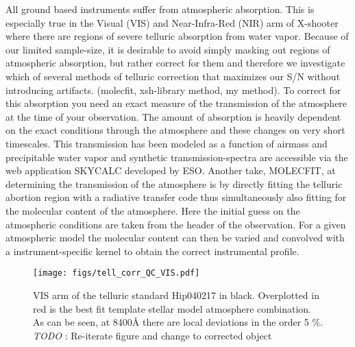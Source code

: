 \documentclass{aa}    %
\newcommand{\figlabel}[1]{\label{fig:#1}}
\newcommand{\todo}[3]{{\color{#2}\emph{#1}: #3}}
\newcommand{\jstodo}[1]{\todo{ \\TODO }{green}{#1}}
\begin{document}
All ground based instruments suffer from atmospheric absorption. This is especially true in the Visual (VIS) and Near-Infra-Red (NIR) arm of X-shooter where there are regions of severe telluric absorption from water vapor. 
Because of our limited sample-size, it is desirable to avoid simply masking out regions of atmospheric absorption, but rather correct for them and therefore we investigate which of several methods of telluric correction that maximizes our S/N without introducing artifacts. (molecfit, xsh-library method, my method). 
To correct for this absorption you need an exact measure of the transmission of the atmosphere at the time of your observation. 
The amount of absorption is heavily dependent on the exact conditions through the atmosphere and these changes on very short timescales. This transmission has been modeled as a function of airmass and precipitable water vapor and synthetic transmission-spectra are accessible via the web application SKYCALC developed by ESO. 
 Another take, MOLECFIT, at determining the transmission of the atmosphere is by directly fitting the telluric abortion region with a radiative transfer code thus simultaneously also fitting for the molecular content of the atmosphere. 
 Here the initial guess on the atmospheric conditions are taken from the header of the observation. 
 For a given atmospheric model the molecular content can then be varied and convolved with a instrument-specific kernel to obtain the correct instrumental profile. 



\begin{figure}[hbtp]
  \centering
  \texttt{[image: figs/tell\_corr\_QC\_VIS.pdf]}
  \caption[]{VIS arm of the telluric standard Hip040217 in black. Overplotted in red is the best fit template stellar model atmosphere combination. As can be seen, at 8400\r{A}  there are local deviations in the order 5 \%. \jstodo{Re-iterate figure and change to corrected object} }
\figlabel{telluric_qc}
\end{figure}
\end{document}
